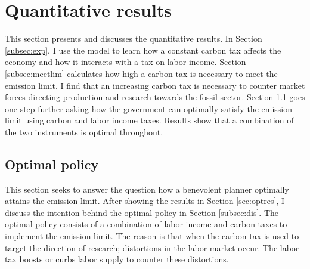 \section{Quantitative results}\label{sec:res}

This section presents and discusses the quantitative results. 
In Section \ref{subsec:exp}, I use the model to learn how a constant carbon tax affects the economy and how it interacts with a tax on labor income. Section \ref{subsec:meetlim} calculates how high a carbon tax is necessary to meet the emission limit. I find that an increasing carbon tax is necessary to counter market forces directing production and research towards the fossil sector. 
Section \ref{subsec:mr} goes one step further asking  how the government can optimally satisfy the emission limit using carbon and labor income taxes. Results show that a combination of the two instruments is optimal throughout. 




\subsection{Optimal policy}\label{subsec:mr}


This section seeks to answer the question how a benevolent planner optimally attains the emission limit. After showing the results in Section \ref{sec:optres}, I discuss the intention behind the optimal policy in Section \ref{subsec:dis}. The optimal policy consists of a combination of labor income and carbon taxes to implement the emission limit. The reason is that when the carbon tax is used to target the direction of research; distortions in the labor market occur. The labor tax boosts or curbs labor supply to counter these distortions. 

